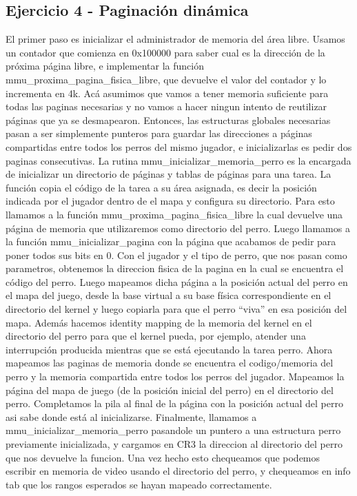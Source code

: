 \documentclass[10pt,a4paper,spanish]{article}
\begin{document}
\subsection{Ejercicio 4 - Paginación dinámica}
El primer paso es inicializar el administrador de memoria del área libre. Usamos un contador que comienza en 0x100000 para saber cual es la dirección de la próxima página libre, e implementar la función mmu_proxima_pagina_fisica_libre, que devuelve el valor del contador y lo incrementa en 4k.
Acá asumimos que vamos a tener memoria suficiente para todas las paginas necesarias y no vamos a hacer ningun intento de reutilizar páginas que ya se desmapearon.
Entonces, las estructuras globales necesarias pasan a ser simplemente punteros para guardar las direcciones a páginas compartidas entre todos los perros del mismo jugador, e inicializarlas es pedir dos paginas consecutivas.
La  rutina mmu_inicializar_memoria_perro es la encargada de inicializar un directorio de páginas y tablas de páginas para una tarea. La función copia el código de la tarea a su área asignada, es decir la posición indicada por el jugador dentro de el mapa y configura su directorio.
Para esto llamamos a la función mmu_proxima_pagina_fisica_libre la cual devuelve una página de memoria que utilizaremos como directorio del perro. Luego llamamos a la función mmu_inicializar_pagina con la página que acabamos de pedir para poner todos sus bits en 0.
Con el jugador y el tipo de perro, que nos pasan como parametros, obtenemos la direccion fisica de la pagina en la cual se encuentra el código del perro.
Luego mapeamos dicha página a la posición actual del perro en el mapa del juego, desde la base virtual a su base física correspondiente en el directorio del kernel y luego copiarla para que el perro “viva” en esa posición del mapa.
Además hacemos identity mapping de la memoria del kernel en el directorio del perro para que el kernel pueda, por ejemplo, atender una interrupción producida mientras que se está ejecutando la tarea perro.
Ahora mapeamos las paginas de memoria donde se encuentra el codigo/memoria del perro y la memoria compartida entre todos los perros del jugador.
Mapeamos la página del mapa de juego (de la posición inicial del perro)  en el directorio del perro.
Completamos la pila al final de la página con la posición actual del perro asi sabe donde está al inicializarse.
Finalmente, llamamos a mmu_inicializar_memoria_perro pasandole un puntero a una estructura perro previamente inicializada, y cargamos en CR3 la direccion al directorio del perro que nos devuelve la funcion. Una vez hecho esto chequeamos que podemos escribir en memoria de video usando el directorio del perro, y chequeamos en info tab que los rangos esperados se hayan mapeado correctamente.
\end{document}
